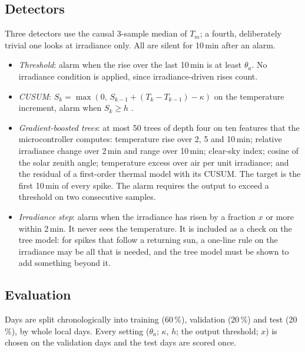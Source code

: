 \documentclass[conference]{IEEEtran}
\begin{document}
\subsection{Detectors}\label{sec:detectors}
Three detectors use the causal 3-sample median of $T_m$; a fourth, deliberately trivial
one looks at irradiance only. All are silent for 10\,min after an alarm.
\begin{itemize}
\item \emph{Threshold}: alarm when the rise over the last 10\,min is at least
$\theta_a$. No irradiance condition is applied, since irradiance-driven rises count.
\item \emph{CUSUM}: $S_k=\max(0,\,S_{k-1}+(T_k-T_{k-1})-\kappa)$ on the temperature
increment, alarm when $S_k\ge h$ \cite{page1954}.
\item \emph{Gradient-boosted trees}: at most 50 trees of depth four \cite{ke2017} on
ten features that the microcontroller computes: temperature rise over 2, 5 and 10\,min;
relative irradiance change over 2\,min and range over 10\,min; clear-sky index;
cosine of the solar zenith angle; temperature excess over air per unit irradiance; and
the residual of a first-order thermal model \cite{faiman2008} with its CUSUM. The
target is the first 10\,min of every spike. The alarm requires the output to exceed a
threshold on two consecutive samples.
\item \emph{Irradiance step}: alarm when the irradiance has risen by a fraction $x$ or
more within 2\,min. It never sees the temperature. It is included as a check on the
tree model: for spikes that follow a returning sun, a one-line rule on the irradiance may
be all that is needed, and the tree model must be shown to add something beyond it.
\end{itemize}

\subsection{Evaluation}
Days are split chronologically into training (60\,\%), validation (20\,\%) and test
(20\,\%), by whole local days. Every setting ($\theta_a$; $\kappa$, $h$; the output
threshold; $x$) is chosen on the validation days and the test days are scored once.
\end{document}
